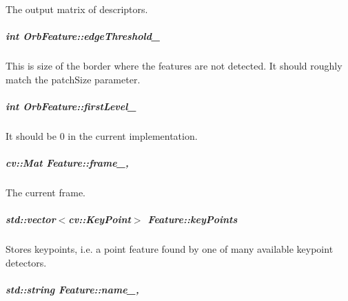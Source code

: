 The output matrix of descriptors. 

\hypertarget{group___feature_extractor_af74609fa7b56d5dea19c9460f42b25ab}{
\subparagraph[{edge\-Threshold\-\_\-}]{\setlength{\rightskip}{0pt plus 5cm}int Orb\-Feature\-::edge\-Threshold\-\_\-\hspace{0.3cm}{\ttfamily [private]}}}\label{group___feature_extractor_af74609fa7b56d5dea19c9460f42b25ab}


This is size of the border where the features are not detected. It should roughly match the patch\-Size parameter. 

\hypertarget{group___feature_extractor_a1c1e186a9f2bc54c38f54f3c1e8f7d0f}{
\subparagraph[{first\-Level\-\_\-}]{\setlength{\rightskip}{0pt plus 5cm}int Orb\-Feature\-::first\-Level\-\_\-\hspace{0.3cm}{\ttfamily [private]}}}\label{group___feature_extractor_a1c1e186a9f2bc54c38f54f3c1e8f7d0f}


It should be 0 in the current implementation. 

\hypertarget{group___feature_extractor_aa805e6fee8eeec2061feabe29430f0df}{
\subparagraph[{frame\-\_\-}]{\setlength{\rightskip}{0pt plus 5cm}cv\-::\-Mat Feature\-::frame\-\_\-\hspace{0.3cm}{\ttfamily [protected]}, {\ttfamily [inherited]}}}\label{group___feature_extractor_aa805e6fee8eeec2061feabe29430f0df}


The current frame. 

\hypertarget{group___feature_extractor_ac666ae973c3840be1b3b9183dd12b8c1}{
\subparagraph[{key\-Points}]{\setlength{\rightskip}{0pt plus 5cm}std\-::vector$<$cv\-::\-Key\-Point$>$ Feature\-::key\-Points\hspace{0.3cm}{\ttfamily [inherited]}}}\label{group___feature_extractor_ac666ae973c3840be1b3b9183dd12b8c1}


Stores keypoints, i.\-e. a point feature found by one of many available keypoint detectors. 

\hypertarget{group___feature_extractor_a46e9fc1f327aaafb10de2c0425d311aa}{
\subparagraph[{name\-\_\-}]{\setlength{\rightskip}{0pt plus 5cm}std\-::string Feature\-::name\-\_\-\hspace{0.3cm}{\ttfamily [protected]}, {\ttfamily [inherited]}}}\label{group___feature_extractor_a46e9fc1f327aaafb10de2c0425d311aa}


